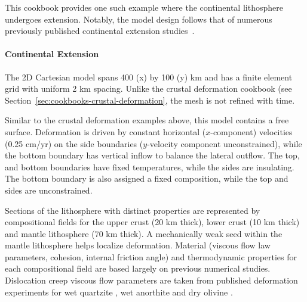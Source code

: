 \documentclass{article}
\begin{document}


This cookbook provides one such example where the continental lithosphere undergoes extension. Notably, the model design follows that of numerous previously published continental extension studies~\cite[and references therein]{Hui11,Bru14,Nal15}.

\paragraph{Continental Extension}
The 2D Cartesian model spans 400 (x) by 100 (y) km and has a finite element grid with uniform 2 km spacing. Unlike the crustal deformation cookbook (see Section~\ref{sec:cookbooks-crustal-deformation}, the mesh is not refined with time.




Similar to the crustal deformation examples above, this model contains a free surface. Deformation is driven by constant horizontal ($x$-component) velocities (0.25 cm/yr) on the side boundaries ($y$-velocity component unconstrained), while the bottom boundary has vertical inflow to balance the lateral outflow. The top, and bottom boundaries have fixed temperatures, while the sides are insulating. The bottom boundary is also assigned a fixed composition, while the top and sides are unconstrained.



Sections of the lithosphere with distinct properties are represented by compositional fields for the upper crust (20 km thick), lower crust (10 km thick) and mantle lithosphere (70 km thick). A mechanically weak seed within the mantle lithosphere helps localize deformation. Material (viscous flow law parameters, cohesion, internal friction angle) and thermodynamic properties for each compositional field are based largely on previous numerical studies.   Dislocation creep viscous flow parameters are taken from published deformation experiments for wet quartzite \cite{RB04}, wet anorthite \cite{RGWD06} and dry olivine \cite{HK04}. 


\end{document}
